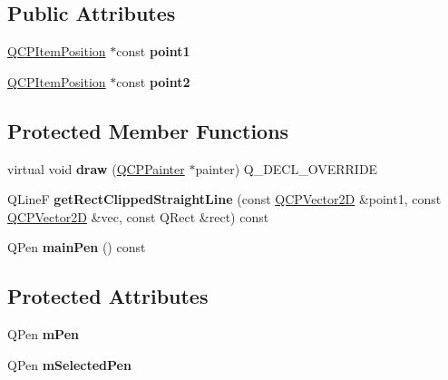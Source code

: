 \subsection*{Public Attributes}
\begin{DoxyCompactItemize}
\item 
\mbox{\label{class_q_c_p_item_straight_line_ac131a6ffe456f2cc7364dce541fe0120}} 
\hyperlink{class_q_c_p_item_position}{Q\+C\+P\+Item\+Position} $\ast$const {\bfseries point1}
\item 
\mbox{\label{class_q_c_p_item_straight_line_ad26c0a732e471f63f75d481dcd48cfc9}} 
\hyperlink{class_q_c_p_item_position}{Q\+C\+P\+Item\+Position} $\ast$const {\bfseries point2}
\end{DoxyCompactItemize}
\subsection*{Protected Member Functions}
\begin{DoxyCompactItemize}
\item 
\mbox{\label{class_q_c_p_item_straight_line_acbc84ad219bf4845152e4e2202fcaa3c}} 
virtual void {\bfseries draw} (\hyperlink{class_q_c_p_painter}{Q\+C\+P\+Painter} $\ast$painter) Q\+\_\+\+D\+E\+C\+L\+\_\+\+O\+V\+E\+R\+R\+I\+DE
\item 
\mbox{\label{class_q_c_p_item_straight_line_ae1de3d4121c06e5ffea4961722a54f5e}} 
Q\+LineF {\bfseries get\+Rect\+Clipped\+Straight\+Line} (const \hyperlink{class_q_c_p_vector2_d}{Q\+C\+P\+Vector2D} \&point1, const \hyperlink{class_q_c_p_vector2_d}{Q\+C\+P\+Vector2D} \&vec, const Q\+Rect \&rect) const
\item 
\mbox{\label{class_q_c_p_item_straight_line_a5b1a39cfc54c3e22f65de2958d40eb59}} 
Q\+Pen {\bfseries main\+Pen} () const
\end{DoxyCompactItemize}
\subsection*{Protected Attributes}
\begin{DoxyCompactItemize}
\item 
\mbox{\label{class_q_c_p_item_straight_line_a15106ddc2ebd73ed5c1bc57aa92bee8f}} 
Q\+Pen {\bfseries m\+Pen}
\item 
\mbox{\label{class_q_c_p_item_straight_line_a0307a0d56a018656adbf798bc84c2a4b}} 
Q\+Pen {\bfseries m\+Selected\+Pen}
\end{DoxyCompactItemize}

